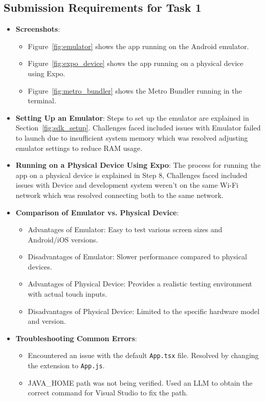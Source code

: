 \documentclass{article}
\begin{document}
\subsection{Submission Requirements for Task 1}
\begin{itemize}
    \item \textbf{Screenshots}: 
    \begin{itemize}
        \item Figure~\ref{fig:emulator} shows the app running on the Android emulator.
        \item Figure~\ref{fig:expo_device} shows the app running on a physical device using Expo.
        \item Figure~\ref{fig:metro_bundler} shows the Metro Bundler running in the terminal.
    \end{itemize}
    \item \textbf{Setting Up an Emulator}: Steps to set up the emulator are explained in Section~\ref{fig:sdk_setup}. Challenges faced included issues with Emulator failed to launch due to insufficient system memory which was resolved adjusting emulator settings to reduce RAM usage.
    \item \textbf{Running on a Physical Device Using Expo}: The process for running the app on a physical device is explained in Step 8, Challenges faced included issues with Device and development system weren’t on the same Wi-Fi network which was resolved connecting both to the same network.
    \item \textbf{Comparison of Emulator vs. Physical Device}: 
    \begin{itemize}
        \item Advantages of Emulator: Easy to test various screen sizes and Android/iOS versions.
        \item Disadvantages of Emulator: Slower performance compared to physical devices.
        \item Advantages of Physical Device: Provides a realistic testing environment with actual touch inputs.
        \item Disadvantages of Physical Device: Limited to the specific hardware model and version.
    \end{itemize}
    \item \textbf{Troubleshooting Common Errors}: 
    \begin{itemize}
        \item Encountered an issue with the default \texttt{App.tsx} file. Resolved by changing the extension to \texttt{App.js}.
        \item JAVA\_HOME path was not being verified. Used an LLM to obtain the correct command for Visual Studio to fix the path.
    \end{itemize}
\end{itemize}
\end{document}
